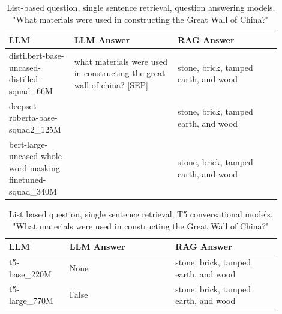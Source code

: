 \documentclass{wseas}
\begin{document}
\begin{table}[htbp]
  \centering
  \caption{List-based question, single sentence retrieval, question answering models. "What materials were used in constructing the Great Wall of China?"} %
  \label{tab:experiment_Q_listBased_R_1Sentence_Q_listBased_M_QaModels_table} 
  \begin{tabular}{|p{0.20\linewidth}|p{0.35\linewidth}|p{0.35\linewidth}|}
    \hline
    \textbf{LLM} & \textbf{LLM Answer} & \textbf{RAG Answer} \\ \hline
    distilbert-base-uncased-distilled-squad\_66M & what materials were used in constructing the great wall of china? {[}SEP{]} & stone, brick, tamped earth, and wood \\ \hline
    deepset roberta-base-squad2\_125M & & stone, brick, tamped earth, and wood \\ \hline
    bert-large-uncased-whole-word-masking-finetuned-squad\_340M & & stone, brick, tamped earth, and wood \\ \hline
  \end{tabular}
\end{table}
\begin{table}[htbp]
  \centering
  \caption{List based question, single sentence retrieval, T5 conversational models. "What materials were used in constructing the Great Wall of China?"} %
  \label{tab:experiment_Q_listBased_R_1Sentence_Q_listBased_M_T5Models_table} 
  \begin{tabular}{|p{0.20\linewidth}|p{0.35\linewidth}|p{0.35\linewidth}|}
    \hline
    \textbf{LLM} & \textbf{LLM Answer} & \textbf{RAG Answer} \\ \hline
    t5-base\_220M & None & stone, brick, tamped earth, and wood \\ \hline
    t5-large\_770M & False & stone, brick, tamped earth, and wood \\ \hline
  \end{tabular}
\end{table}
\end{document}
